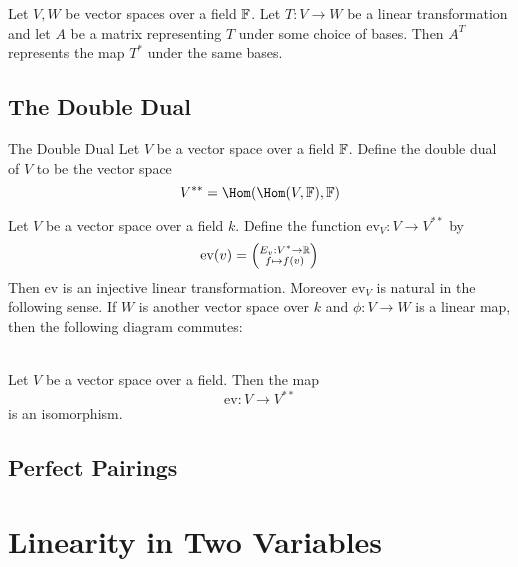 \documentclass[a4paper]{article}
\begin{document}
\begin{thm}{}{} Let $V,W$ be vector spaces over a field $\mathbb{F}$. Let $T:V\to W$ be a linear transformation and let $A$ be a matrix representing $T$ under some choice of bases. Then $A^T$ represents the map $T^\ast$ under the same bases. 
\end{thm}

\subsection{The Double Dual}
\begin{defn}{The Double Dual}{} Let $V$ be a vector space over a field $\mathbb{F}$. Define the double dual of $V$ to be the vector space $$V^{\ast\ast}=\Hom(\Hom(V,\F),\F)$$
\end{defn}

\begin{thm}{}{} Let $V$ be a vector space over a field $k$. Define the function $\text{ev}_V:V\to V^{\ast\ast}$ by $$\text{ev}(v)=\left(\substack{E_v:V^\ast\to\mathbb{R}\\f\mapsto f(v)}\right)$$ Then $\text{ev}$ is an injective linear transformation. Moreover $\text{ev}_V$ is natural in the following sense. If $W$ is another vector space over $k$ and $\phi:V\to W$ is a linear map, then the following diagram commutes: \\
\\
\end{thm}

\begin{lmm}{}{} Let $V$ be a vector space over a field. Then the map $$\text{ev}:V\to V^{\ast\ast}$$ is an isomorphism. 
\end{lmm}

\subsection{Perfect Pairings}

\pagebreak
\section{Linearity in Two Variables}
\end{document}
